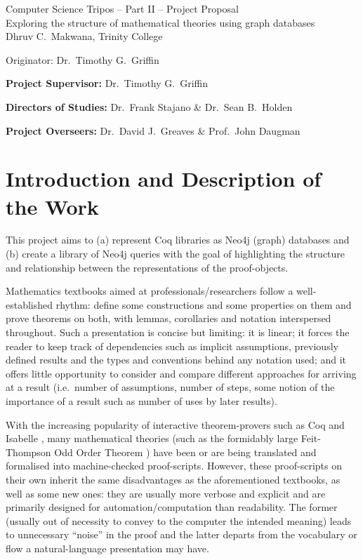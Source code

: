 \documentclass[12pt,a4paper]{article}
\begin{document}
\begin{center}
\Large
Computer Science Tripos -- Part II -- Project Proposal\\[4mm]
\LARGE
Exploring the structure of mathematical theories using graph databases\\[4mm]

\large
Dhruv C.~Makwana, Trinity College

Originator: Dr.~Timothy G.~Griffin

\end{center}

\vspace{5mm}

\textbf{Project Supervisor:} Dr.~Timothy G.~Griffin

\textbf{Directors of Studies:} Dr.~Frank Stajano \& Dr.~Sean B.~Holden

\textbf{Project Overseers:} Dr.~David J.~Greaves  \& Prof.~John Daugman

\section*{Introduction and Description of the Work}
This project aims to (a) represent Coq libraries as Neo4j (graph) databases
and (b) create a library of Neo4j queries with the goal of highlighting
the structure and relationship between the representations of the proof-objects.

Mathematics textbooks aimed at professionals/researchers follow a well-established
rhythm: define some constructions and some properties on them and prove
theorems on both, with lemmas, corollaries and notation interspersed
throughout. Such a presentation is concise but limiting: it is linear; it forces
the reader to keep track of dependencies such as implicit assumptions, previously
defined results and the types and conventions behind any notation used;
and it offers little opportunity to consider and compare different approaches
for arriving at a result (i.e.\ number of assumptions, number of steps, some
notion of the importance of a result such as number of uses by later
results).

With the increasing popularity of interactive theorem-provers such as Coq
\cite{Coq:manual} and Isabelle \cite{nipkow2002isabelle}, many mathematical theories
(such as the formidably large Feit-Thompson Odd Order Theorem
\cite{peterfalvi2000oot, bender1994oot}) have been \cite{gonthier2013oot} or are being
translated and formalised into machine-checked proof-scripts. However, these
proof-scripts on their own inherit the same disadvantages as the aforementioned
textbooks, as well as some new ones: they are usually more verbose and explicit
and are primarily designed for automation/computation than readability. The
former (usually out of necessity to convey to the computer the intended
meaning) leads to unnecessary ``noise'' in the proof and the latter departs
from the vocabulary or flow a natural-language presentation may have.
\end{document}
